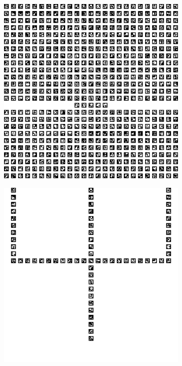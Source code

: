 \documentclass[../Head/report.tex]{subfiles}
\begin{document}
\begin{figure}[H]
    \centering
    \begin{subfigure}[t]{.20\textwidth}
        \centering
        \includegraphics[width=\textwidth]{../Figures/vision_navigation/grid_board_new_200_full.png}
        \caption{}
        \label{fig:vision_navigation_full_pattern_board}
    \end{subfigure}
     \hspace{0.2em}
    \begin{subfigure}[t]{.20\textwidth}
        \centering
        \includegraphics[width=\textwidth]{../Figures/vision_navigation/grid_board_new_200_big_onepattern.png}

\end{subfigure}
\end{figure}
\end{document}

